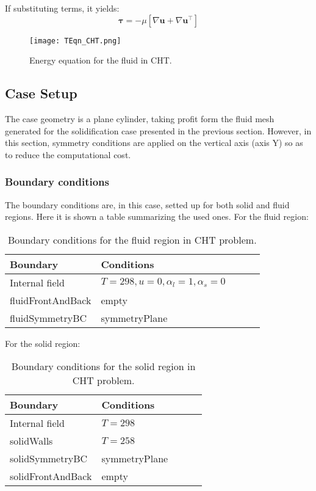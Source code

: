If substituting terms, it yields:
\begin{equation}
	\boldsymbol{\tau}=-\mu\left[\nabla \mathbf{u}+\nabla \mathbf{u}^{\top}\right]
	\label{4.8}
\end{equation}
\begin{figure}[h!]
	\centering
	\texttt{[image: TEqn\_CHT.png]}	
	\label{4.4fig}
	\caption{Energy equation for the fluid in CHT.}
\end{figure} 
\subsection{Case Setup}
The case geometry is a plane cylinder, taking profit form the fluid mesh generated for the solidification case presented in the previous section. However, in this section, symmetry conditions are applied on the vertical axis (axis Y) so as to reduce the computational cost. 
\subsubsection{Boundary conditions}
The boundary conditions are, in this case, setted up for both solid and fluid regions. Here it is shown a table summarizing the used ones.
\newline
For the fluid region:
\begin{table}[h!]
	\begin{tabular}{@{}lllll@{}}
		\toprule[1pt]
		\textbf{Boundary} & \textbf{Conditions}  \\ \midrule[2pt]
		Internal field & $ T = 298, u = 0, \alpha_{l} = 1, \alpha_{s} = 0    $  \\
		fluidFrontAndBack & empty \\
		fluidSymmetryBC & symmetryPlane \\ \bottomrule[1pt]		
	\end{tabular}
	\centering
	\caption{Boundary conditions for the fluid region in CHT problem.}	
	\label{4.1tab}
\end{table}
For the solid region:
\begin{table}[h!]
	\begin{tabular}{@{}lllll@{}}
		\toprule[1pt]
		\textbf{Boundary} & \textbf{Conditions}  \\ \midrule[2pt]
		Internal field & $ T = 298$\\
		solidWalls & $T = 258$ \\
		solidSymmetryBC & symmetryPlane \\
		solidFrontAndBack & empty \\ \bottomrule[1pt]		
	\end{tabular}
	\centering
	\caption{Boundary conditions for the solid region in CHT problem.}	
	\label{4.2tab}
\end{table}

